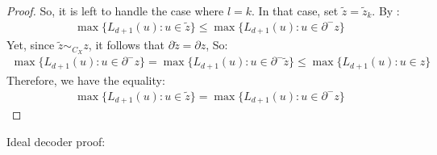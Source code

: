 \begin{proof}
So, it is left to handle the case where $l = k$. In that case, set $\tilde{z} = \tilde{z}_{k}$. By :
\begin{equation*}
  \begin{split}
    \max \big\{ L_{d+1}(u) :  u \in \tilde{z} \big\} \le  \max \big\{ L_{d+1}(u) : u \in \partial^{-} z \big\}
  \end{split}
\end{equation*}
Yet, since $\tilde{z} \sim_{C_{X}} z$, it follows that $\partial \tilde{z} = \partial z$, So: 
\begin{equation*}
  \begin{split}
     \max \big\{ L_{d+1}(u) :  u \in \partial^{-} z \big\} = \max \big\{ L_{d+1}(u) :  u \in  \partial^{-} \tilde{z} \big\} \le \max \big\{ L_{d+1}(u) : u \in z \big\} 
  \end{split}
\end{equation*}
Therefore, we have the equality:
\begin{equation*}
  \begin{split}
    \max \big\{ L_{d+1}(u) :  u \in \tilde{z} \big\} = \max \big\{ L_{d+1}(u) : u \in \partial^{-} z \big\}
  \end{split}
\end{equation*}
\end{proof}


 Ideal decoder proof: 

